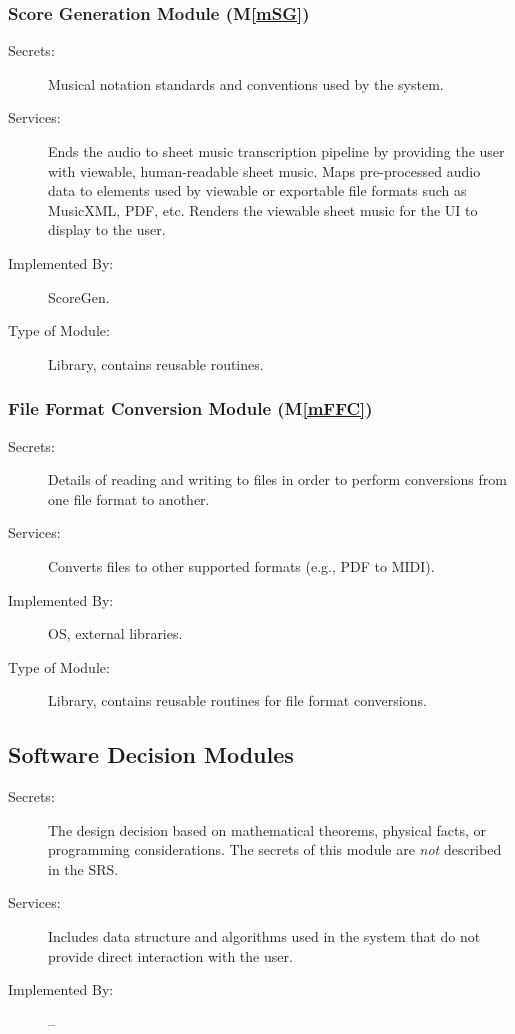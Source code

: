 \documentclass[12pt, titlepage]{article}
\newcommand{\mref}[1]{M\ref{#1}}
\begin{document}
\subsubsection{Score Generation Module (\mref{mSG})}

\begin{description}
\item[Secrets:] Musical notation standards and conventions used by the system.
\item[Services:] Ends the audio to sheet music transcription pipeline by providing the user with viewable, human-readable sheet music.
  Maps pre-processed audio data to elements used by viewable or exportable file formats such as MusicXML, PDF, etc.
  Renders the viewable sheet music for the UI to display to the user.
\item[Implemented By:] ScoreGen.
\item[Type of Module:] Library, contains reusable routines.
\end{description}

\subsubsection{File Format Conversion Module (\mref{mFFC})}

\begin{description}
\item[Secrets:] Details of reading and writing to files in order to perform conversions from one file format to another.
\item[Services:] Converts files to other supported formats (e.g., PDF to MIDI).
\item[Implemented By:] OS, external libraries.
\item[Type of Module:] Library, contains reusable routines for file format conversions.
\end{description}

\subsection{Software Decision Modules}

\begin{description}
\item[Secrets:] The design decision based on mathematical theorems, physical
  facts, or programming considerations. The secrets of this module are
  \emph{not} described in the SRS.
\item[Services:] Includes data structure and algorithms used in the system that
  do not provide direct interaction with the user. 
\item[Implemented By:] --
\end{description}
\end{document}
